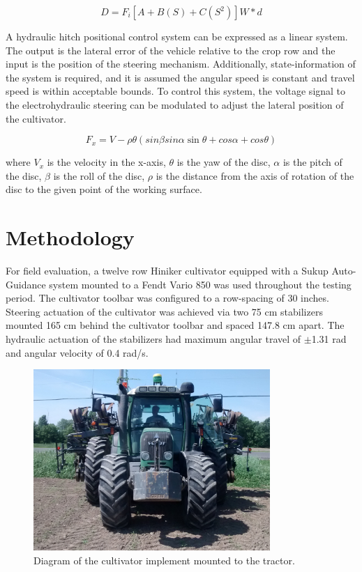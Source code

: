 \documentclass[authoryear]{elsarticle}
\begin{document}
\begin{equation}
  D = F_{i} \left[ A + B(S) + C(S^2) \right] W * d
  \label{eq:soil_resistance}
\end{equation}

A hydraulic hitch positional control system can be expressed as a
linear system. The output is the lateral error of the vehicle relative
to the crop row and the input is the position of the steering
mechanism. Additionally, state-information of the system is required,
and it is assumed the angular speed is constant and travel speed is
within acceptable bounds. To control this system, the voltage signal
to the electrohydraulic steering can be modulated to adjust the
lateral position of the cultivator.

\begin{equation}
  F_x = V - \rho\theta(sin \beta sin \alpha \sin \theta + cos \alpha +
  cos \theta)
  \label{eq:horizontal_velocity}
\end{equation}
\begin{flushleft}
where $V_x$ is the velocity in the x-axis, $\theta$ is the yaw of the
disc, $\alpha$ is the pitch of the
disc, $\beta$ is the roll of the disc, $\rho$ is the distance from
the axis of rotation of the disc to the given point of the working surface.
\end{flushleft}

\section{Methodology}
For field evaluation, a twelve row Hiniker cultivator equipped with a
Sukup Auto-Guidance system mounted to a Fendt Vario 850 was used
throughout the testing period. The cultivator toolbar was configured
to a row-spacing of 30 inches. Steering actuation of the cultivator
was achieved via two 75 cm stabilizers mounted 165 cm behind the
cultivator toolbar and spaced 147.8 cm apart. The hydraulic actuation
of the stabilizers had maximum angular travel of $\pm$1.31 rad and angular
velocity of 0.4 rad/s.

\begin{figure}
  \centering
  \includegraphics[width=0.8\textwidth,natwidth=610,natheight=642]{fendt_front.jpg}
  \caption{Diagram of the cultivator implement mounted to the tractor.}
\end{figure}
\end{document}
